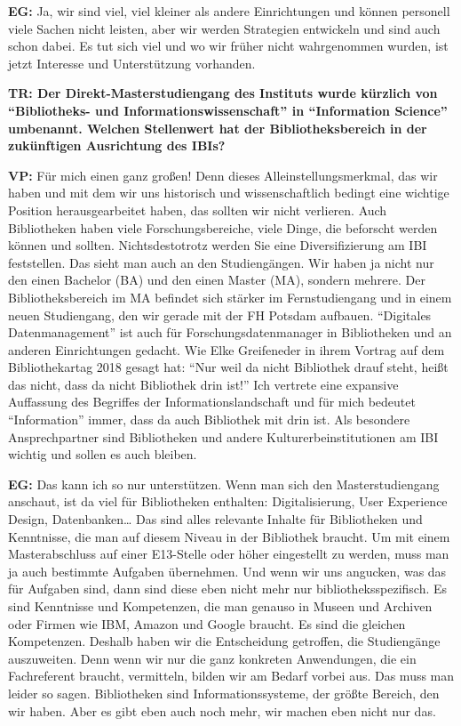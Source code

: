 \documentclass[a4paper,
fontsize=11pt,
oneside,
numbers=noperiodatend,
parskip=half-,
bibliography=totoc,
final
]{scrartcl}
\begin{document}
\textbf{EG:} Ja, wir sind viel, viel kleiner als andere Einrichtungen
und können personell viele Sachen nicht leisten, aber wir werden
Strategien entwickeln und sind auch schon dabei. Es tut sich viel und wo
wir früher nicht wahrgenommen wurden, ist jetzt Interesse und
Unterstützung vorhanden.

\textbf{TR: Der Direkt-Masterstudiengang des Instituts wurde kürzlich
von \enquote{Bibliotheks- und Informationswissenschaft} in
\enquote{Information Science} umbenannt. Welchen Stellenwert hat der
Bibliotheksbereich in der zukünftigen Ausrichtung des IBIs?}

\textbf{VP:} Für mich einen ganz großen! Denn dieses
Alleinstellungsmerkmal, das wir haben und mit dem wir uns historisch und
wissenschaftlich bedingt eine wichtige Position herausgearbeitet haben,
das sollten wir nicht verlieren. Auch Bibliotheken haben viele
Forschungsbereiche, viele Dinge, die beforscht werden können und
sollten. Nichtsdestotrotz werden Sie eine Diversifizierung am IBI
feststellen. Das sieht man auch an den Studiengängen. Wir haben ja nicht
nur den einen Bachelor (BA) und den einen Master (MA), sondern mehrere.
Der Bibliotheksbereich im MA befindet sich stärker im Fernstudiengang
und in einem neuen Studiengang, den wir gerade mit der FH Potsdam
aufbauen. \enquote{Digitales Datenmanagement} ist auch für
Forschungsdatenmanager in Bibliotheken und an anderen Einrichtungen
gedacht. Wie Elke Greifeneder in ihrem Vortrag auf dem Bibliothekartag
2018 gesagt hat: \enquote{Nur weil da nicht Bibliothek drauf steht,
heißt das nicht, dass da nicht Bibliothek drin ist!} Ich vertrete eine
expansive Auffassung des Begriffes der Informationslandschaft und für
mich bedeutet \enquote{Information} {immer}, dass da auch Bibliothek mit
drin ist. Als besondere Ansprechpartner sind Bibliotheken und andere
Kulturerbeinstitutionen am IBI wichtig und sollen es auch bleiben.

\textbf{EG:} Das kann ich so nur unterstützen. Wenn man sich den
Masterstudiengang anschaut, ist da viel für Bibliotheken enthalten:
Digitalisierung, User Experience Design, Datenbanken\ldots{} Das sind
alles relevante Inhalte für Bibliotheken und Kenntnisse, die man auf
diesem Niveau in der Bibliothek braucht. Um mit einem Masterabschluss
auf einer E13-Stelle oder höher eingestellt zu werden, muss man ja auch
bestimmte Aufgaben übernehmen. Und wenn wir uns angucken, was das für
Aufgaben sind, dann sind diese eben nicht mehr {nur}
bibliotheksspezifisch. Es sind Kenntnisse und Kompetenzen, die man
genauso in Museen und Archiven oder Firmen wie IBM, Amazon und Google
braucht. Es sind die gleichen Kompetenzen. Deshalb haben wir die
Entscheidung getroffen, die Studiengänge auszuweiten. Denn wenn wir nur
die ganz konkreten Anwendungen, die ein Fachreferent braucht,
vermitteln, bilden wir am Bedarf vorbei aus. Das muss man leider so
sagen. Bibliotheken sind Informationssysteme, der größte Bereich, den
wir haben. Aber es gibt eben auch noch mehr, wir machen eben nicht nur
das.
\end{document}
